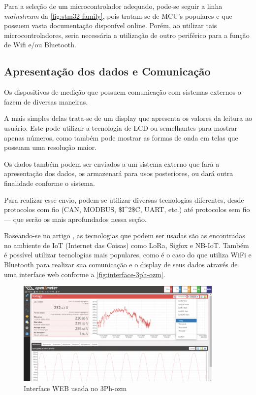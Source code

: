 Para a seleção de um microcontrolador adequado, pode-se seguir a linha \textit{mainstream} da \autoref{fig:stm32-family}, pois tratam-se de \gls{MCU}'s populares e que possuem vasta documentação disponível online. Porém, ao utilizar tais microcontroladores, seria necessária a utilização de outro periférico para a função de Wifi e/ou Bluetooth.

\subsection{Apresentação dos dados e Comunicação}\label{sec:Interface}

Os dispositivos de medição que possuem comunicação com sistemas externos o fazem de diversas maneiras.

A mais simples delas trata-se de um display que apresenta os valores da leitura ao usuário. Este pode utilizar a tecnologia de \gls{LCD} ou semelhantes para mostrar apenas números, como também pode mostrar as formas de onda em telas que possuam uma resolução maior.

Os dados também podem ser enviados a um sistema externo que fará a apresentação dos dados, os armazenará para usos posteriores, ou dará outra finalidade conforme o sistema.

Para realizar esse envio, podem-se utilizar diversas tecnologias diferentes, desde protocolos com fio (CAN, MODBUS, \gls{$I^2$C}, UART, etc.) até protocolos sem fio --- que serão os mais aprofundados nessa seção.

Baseando-se no artigo \citet{lowcost-smartmeter}, as tecnologias que podem ser usadas são as encontradas no ambiente de IoT (Internet das Coisas) como LoRa, Sigfox e NB-IoT. Também é possível utilizar tecnologias mais populares, como é o caso do \citet{3ph-ozm} que utiliza WiFi e Bluetooth para realizar sua comunicação e o display de seus dados através de uma interface web conforme a \autoref{fig:interface-3ph-ozm}.

\begin{figure}[htb!]
    \caption{Interface WEB usada no 3Ph-ozm}
    \label{fig:interface-3ph-ozm}
    \includegraphics[width=0.9\textwidth]{figuras/interface-web-openzmeter.png}
\end{figure}

